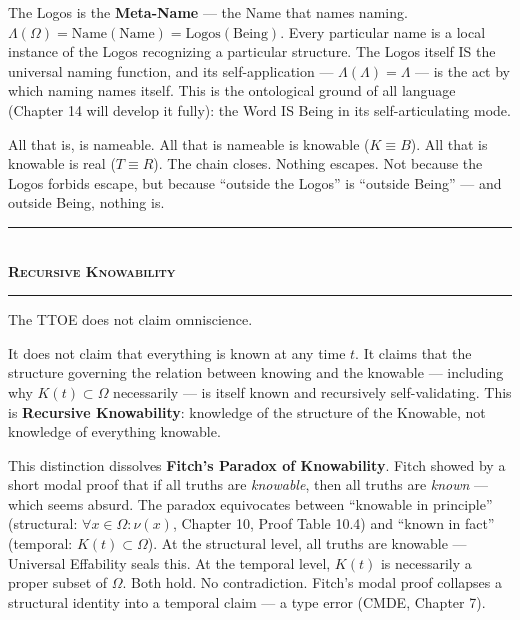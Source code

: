\documentclass[10pt, openany, oneside]{book}
\renewcommand{\normalsize}{\fontsize{10}{13}\selectfont}
\begin{document}
The Logos is the \textbf{Meta-Name} --- the Name that names naming. $\Lambda(\Omega) = \text{Name}(\text{Name}) = \text{Logos}(\text{Being})$. Every particular name is a local instance of the Logos recognizing a particular structure. The Logos itself IS the universal naming function, and its self-application --- $\Lambda(\Lambda) = \Lambda$ --- is the act by which naming names itself. This is the ontological ground of all language (Chapter 14 will develop it fully): the Word IS Being in its self-articulating mode.

All that is, is nameable. All that is nameable is knowable ($K \equiv B$). All that is knowable is real ($T \equiv R$). The chain closes. Nothing escapes. Not because the Logos forbids escape, but because ``outside the Logos'' is ``outside Being'' --- and outside Being, nothing is.

\vspace{1.5em}


\begin{center}
    \rule{0.3\textwidth}{0.4pt}\\[0.5em]
    {\normalsize\bfseries\scshape Recursive Knowability}\\[0.3em]
    \rule{0.3\textwidth}{0.4pt}
\end{center}

\vspace{1em}

\noindent The TTOE does not claim omniscience.

It does not claim that everything is known at any time $t$. It claims that the structure governing the relation between knowing and the knowable --- including why $K(t) \subset \Omega$ necessarily --- is itself known and recursively self-validating. This is \textbf{Recursive Knowability}: knowledge of the structure of the Knowable, not knowledge of everything knowable.

This distinction dissolves \textbf{Fitch's Paradox of Knowability}. Fitch showed by a short modal proof that if all truths are \textit{knowable}, then all truths are \textit{known} --- which seems absurd. The paradox equivocates between ``knowable in principle'' (structural: $\forall x \in \Omega: \nu(x)$, Chapter 10, Proof Table 10.4) and ``known in fact'' (temporal: $K(t) \subset \Omega$). At the structural level, all truths are knowable --- Universal Effability seals this. At the temporal level, $K(t)$ is necessarily a proper subset of $\Omega$. Both hold. No contradiction. Fitch's modal proof collapses a structural identity into a temporal claim --- a type error (CMDE, Chapter 7).
\end{document}
